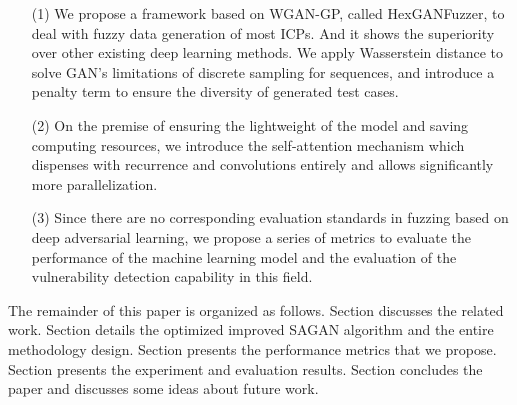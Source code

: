 \begin{itemize}
\item[(1)] We propose a framework based on WGAN-GP, called HexGANFuzzer, to deal with fuzzy data generation of most ICPs. And it shows the superiority over other existing deep learning methods.
We apply Wasserstein distance \cite{arjovsky2017wasserstein}  to solve GAN's limitations of discrete sampling for sequences, and introduce a penalty term to ensure the diversity of generated test cases.
\item[(2)] On the premise of ensuring the lightweight of the model and saving computing resources, we introduce the self-attention mechanism which dispenses with recurrence and convolutions entirely and allows significantly more parallelization. %
\item[(3)] Since there are no corresponding evaluation standards in fuzzing based on deep adversarial learning, we propose a series of metrics to evaluate the performance of the machine learning model and the evaluation of the vulnerability detection capability in this field.

\end{itemize}


The remainder of this paper is organized as follows. Section \uppercase\expandafter{} discusses the related work. Section \uppercase\expandafter{} details the optimized improved SAGAN algorithm and the entire methodology design. Section \uppercase\expandafter{} presents the performance metrics that we propose. Section \uppercase\expandafter{} presents the experiment and evaluation results. Section \uppercase\expandafter{} concludes the paper and discusses some ideas about future work.
